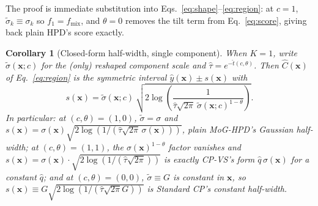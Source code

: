 \documentclass[10pt,twocolumn,a4paper]{article}
\newtheorem{corollary}{Corollary}
\begin{document}
The proof is immediate substitution into Eqs.~\eqref{eq:shape}--\eqref{eq:region}: at $c=1$,
$\tilde\sigma_k \equiv \sigma_k$ so $f_1=f_{\mathrm{mix}}$, and $\theta=0$ removes the tilt term from
Eq.~\eqref{eq:score}, giving back plain HPD's score exactly.

\begin{corollary}[Closed-form half-width, single component]
\label{cor:k1closedform}
When $K=1$, write $\tilde\sigma(\bm x;c)$ for the (only) reshaped component scale and
$\hat\tau=e^{-\hat t(c,\theta)}$. Then $\hat C(\bm x)$ of Eq.~\eqref{eq:region} is the symmetric
interval $\hat y(\bm x)\pm s(\bm x)$ with
\begin{equation}
s(\bm x) = \tilde\sigma(\bm x;c)\ \sqrt{2\log\!\left(\frac{1}{\hat\tau\sqrt{2\pi}\ \tilde\sigma(\bm x;c)^{1-\theta}}\right)}.
\label{eq:k1closedform}
\end{equation}
In particular: at $(c,\theta)=(1,0)$, $\tilde\sigma=\sigma$ and $s(\bm x)=\sigma(\bm x)\sqrt{2\log(1/(\hat\tau\sqrt{2\pi}\,\sigma(\bm x)))}$,
plain MoG-HPD's Gaussian half-width; at $(c,\theta)=(1,1)$, the $\sigma(\bm x)^{1-\theta}$ factor
vanishes and $s(\bm x)=\sigma(\bm x)\cdot\sqrt{2\log(1/(\hat\tau\sqrt{2\pi}))}$ is exactly CP-VS's
form $\hat q\,\sigma(\bm x)$ for a constant $\hat q$; and at $(c,\theta)=(0,0)$,
$\tilde\sigma\equiv G$ is constant in $\bm x$, so $s(\bm x)\equiv G\sqrt{2\log(1/(\hat\tau\sqrt{2\pi}G))}$
is Standard CP's constant half-width.
\end{corollary}
\end{document}
